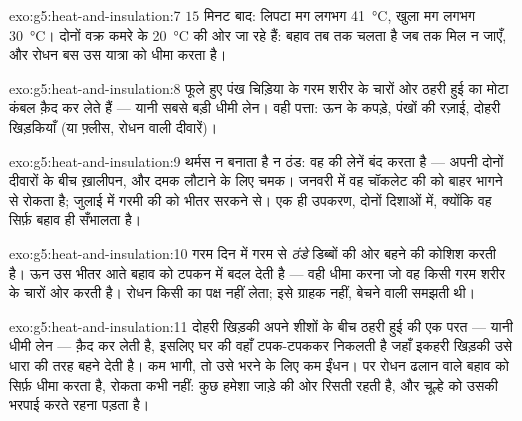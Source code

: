 \begin{solution}{exo:g5:heat-and-insulation:7}
$15$ मिनट बाद: लिपटा मग लगभग \qty{41}{\celsius}, खुला मग लगभग
\qty{30}{\celsius}। दोनों वक्र कमरे के \qty{20}{\celsius} की ओर जा
रहे हैं: बहाव तब तक चलता है जब तक  मिल न जाएँ, और रोधन बस उस
यात्रा को धीमा करता है।
\end{solution}

\begin{solution}{exo:g5:heat-and-insulation:8}
फूले हुए पंख चिड़िया के गरम शरीर के चारों ओर ठहरी हुई  का मोटा
कंबल क़ैद कर लेते हैं --- यानी सबसे बड़ी धीमी लेन। वही पत्ता: ऊन के
कपड़े, पंखों की रज़ाई, दोहरी खिड़कियाँ (या फ़्लीस, रोधन वाली दीवारें)।
\end{solution}

\begin{solution}{exo:g5:heat-and-insulation:9}
थर्मस न  बनाता है न ठंड: वह  की लेनें बंद करता है ---
अपनी दोनों दीवारों के बीच ख़ालीपन, और दमक लौटाने के लिए चमक। जनवरी में
वह चॉकलेट की  को बाहर भागने से रोकता है; जुलाई में गरमी की 
को भीतर सरकने से। एक ही उपकरण, दोनों दिशाओं में, क्योंकि वह सिर्फ़
बहाव ही सँभालता है।
\end{solution}

\begin{solution}{exo:g5:heat-and-insulation:10}
गरम दिन में  गरम  से \emph{ठंडे} डिब्बों की ओर बहने की कोशिश
करती है। ऊन उस भीतर आते बहाव को टपकन में बदल देती है --- वही धीमा करना
जो वह किसी गरम शरीर के चारों ओर करती है। रोधन किसी का पक्ष नहीं लेता;
इसे ग्राहक नहीं, बेचने वाली समझती थी।
\end{solution}

\begin{solution}{exo:g5:heat-and-insulation:11}
दोहरी खिड़की अपने शीशों के बीच ठहरी हुई  की एक परत --- यानी धीमी
लेन --- क़ैद कर लेती है, इसलिए घर की  वहाँ टपक-टपककर निकलती है
जहाँ इकहरी खिड़की उसे धारा की तरह बहने देती है। कम  भागी, तो उसे
भरने के लिए कम ईंधन। पर रोधन ढलान वाले बहाव को सिर्फ़ धीमा करता है,
रोकता कभी नहीं: कुछ  हमेशा जाड़े की ओर रिसती रहती है, और चूल्हे
को उसकी भरपाई करते रहना पड़ता है।
\end{solution}
